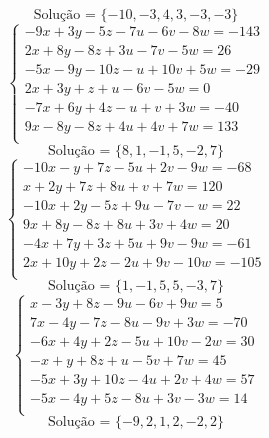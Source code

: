 \documentclass[12pt,oneside,a4paper]{article}
\begin{document}
\begin{equation*}
\text{Solução = }\{-10,-3,4,3,-3,-3\}
\end{equation*}
\vspace{\baselineskip}
\begin{equation*}
\begin{cases}
-9x+3y-5z-7u-6v-8w=-143 \\
2x+8y-8z+3u-7v-5w=26 \\
-5x-9y-10z-u+10v+5w=-29 \\
2x+3y+z+u-6v-5w=0 \\
-7x+6y+4z-u+v+3w=-40 \\
9x-8y-8z+4u+4v+7w=133 \\
\end{cases}
\end{equation*}
\begin{equation*}
\text{Solução = }\{8,1,-1,5,-2,7\}
\end{equation*}
\vspace{\baselineskip}
\begin{equation*}
\begin{cases}
-10x-y+7z-5u+2v-9w=-68 \\
x+2y+7z+8u+v+7w=120 \\
-10x+2y-5z+9u-7v-w=22 \\
9x+8y-8z+8u+3v+4w=20 \\
-4x+7y+3z+5u+9v-9w=-61 \\
2x+10y+2z-2u+9v-10w=-105 \\
\end{cases}
\end{equation*}
\begin{equation*}
\text{Solução = }\{1,-1,5,5,-3,7\}
\end{equation*}
\vspace{\baselineskip}
\begin{equation*}
\begin{cases}
x-3y+8z-9u-6v+9w=5 \\
7x-4y-7z-8u-9v+3w=-70 \\
-6x+4y+2z-5u+10v-2w=30 \\
-x+y+8z+u-5v+7w=45 \\
-5x+3y+10z-4u+2v+4w=57 \\
-5x-4y+5z-8u+3v-3w=14 \\
\end{cases}
\end{equation*}
\begin{equation*}
\text{Solução = }\{-9,2,1,2,-2,2\}
\end{equation*}
\end{document}
